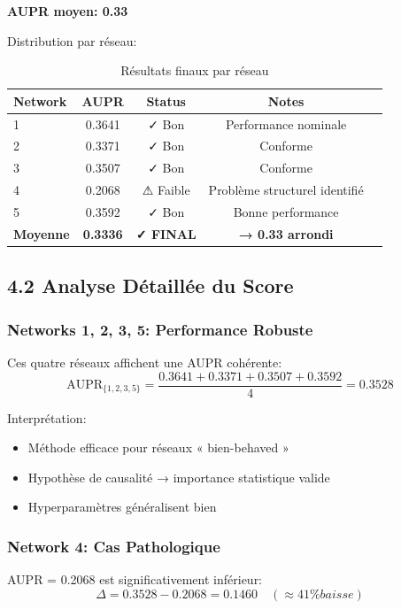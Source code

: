 \documentclass[12pt,a4paper,french]{article}
\begin{document}
\textbf{AUPR moyen: 0.33}

Distribution par réseau:
\begin{table}[H]
\centering
\begin{tabular}{lcccc}
\toprule
\textbf{Network} & \textbf{AUPR} & \textbf{Status} & \textbf{Notes} \\
\midrule
1 & 0.3641 & ✓ Bon & Performance nominale \\
2 & 0.3371 & ✓ Bon & Conforme \\
3 & 0.3507 & ✓ Bon & Conforme \\
4 & 0.2068 & ⚠ Faible & Problème structurel identifié \\
5 & 0.3592 & ✓ Bon & Bonne performance \\
\midrule
\textbf{Moyenne} & \textbf{0.3336} & \textbf{✓ FINAL} & \textbf{→ 0.33 arrondi} \\
\bottomrule
\end{tabular}
\caption{Résultats finaux par réseau}
\end{table}

\subsection{4.2 Analyse Détaillée du Score}

\subsubsection{Networks 1, 2, 3, 5: Performance Robuste}

Ces quatre réseaux affichent une AUPR cohérente:
\begin{equation}
\text{AUPR}_{\{1,2,3,5\}} = \frac{0.3641 + 0.3371 + 0.3507 + 0.3592}{4} = 0.3528
\end{equation}

Interprétation:
\begin{itemize}
    \item Méthode efficace pour réseaux « bien-behaved »
    \item Hypothèse de causalité → importance statistique valide
    \item Hyperparamètres généralisent bien
\end{itemize}

\subsubsection{Network 4: Cas Pathologique}

AUPR = 0.2068 est significativement inférieur:
\begin{equation}
\Delta = 0.3528 - 0.2068 = 0.1460 \quad (\approx 41\% baisse)
\end{equation}
\end{document}
